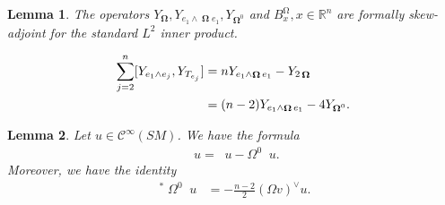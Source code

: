 \documentclass[10pt,a4paper]{amsart}
\newtheorem{lem}{Lemma}
\newcommand{\R}{\mathbb{R}}
\DeclareMathOperator{\mg}{\Omega}
\DeclareMathOperator{\nh}{\nabla_{\mathbb{H}}}
\DeclareMathOperator{\nhs}{\nabla_{\mathbb{H}^{\mg}}}
\DeclareMathOperator{\nv}{\nabla_{\mathbb{V}}}
\DeclareMathOperator{\oo}{\mathbf{\Omega}}
\begin{document}
\begin{lem} \label{lem:skew_adj}
The operators $Y_{\oo}, Y_{e_1 \wedge \oo e_1}, Y_{\oo^0}$ and $B_x^{\mg}, x \in \R^n$ are formally skew-adjoint for the standard $L^2$ inner product.
\end{lem}

\begin{align} \label{eq:skew_adjoint_part}
\sum_{j=2}^n [Y_{e_1 \wedge e_j}, Y_{T_{e_j}}]
&= n Y_{e_1 \wedge \oo e_1} - Y_{2 \oo} \\ 
&= (n - 2) Y_{e_1 \wedge \oo e_1} - 4 Y_{\oo^0}. \notag
\end{align}

\begin{lem} \label{lem:mag_hor_grad}
Let $u \in \mathcal{C}^\infty(SM)$. We have the formula 
\begin{align*}
\nhs u = \nh u - \Omega^0 \nv u.
\end{align*}
Moreover, we have the identity 
\begin{align*}
\nv^* \Omega^0 \nv u &= - \frac{n-2}{2} (\Omega v)^\vee u.
\end{align*}
\end{lem}
\end{document}
